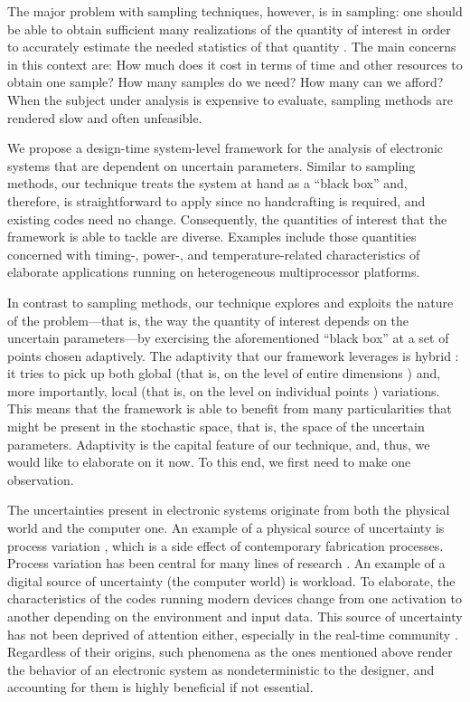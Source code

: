 The major problem with sampling techniques, however, is in sampling: one should
be able to obtain sufficient many realizations of the quantity of interest in
order to accurately estimate the needed statistics of that quantity
\cite{diaz-emparanza2002}. The main concerns in this context are: How much does
it cost in terms of time and other resources to obtain one sample? How many
samples do we need? How many can we afford? When the subject under analysis is
expensive to evaluate, sampling methods are rendered slow and often unfeasible.

We propose a design-time system-level framework for the analysis of electronic
systems that are dependent on uncertain parameters. Similar to sampling methods,
our technique treats the system at hand as a ``black box'' and, therefore, is
straightforward to apply since no handcrafting is required, and existing codes
need no change. Consequently, the quantities of interest that the framework is
able to tackle are diverse. Examples include those quantities concerned with
timing-, power-, and temperature-related characteristics of elaborate
applications running on heterogeneous multiprocessor platforms.

In contrast to sampling methods, our technique explores and exploits the nature
of the problem---that is, the way the quantity of interest depends on the
uncertain parameters---by exercising the aforementioned ``black box'' at a set
of points chosen adaptively. The adaptivity that our framework leverages is
hybrid \cite{jakeman2012}: it tries to pick up both global (that is, on the
level of entire dimensions \cite{klimke2006}) and, more importantly, local (that
is, on the level on individual points \cite{ma2009}) variations. This means that
the framework is able to benefit from many particularities that might be present
in the stochastic space, that is, the space of the uncertain parameters.
Adaptivity is the capital feature of our technique, and, thus, we would like to
elaborate on it now. To this end, we first need to make one observation.

The uncertainties present in electronic systems originate from both the physical
world and the computer one. An example of a physical source of uncertainty is
process variation \cite{srivastava2005}, which is a side effect of contemporary
fabrication processes. Process variation has been central for many lines of
research \cite{bhardwaj2008, juan2012, lee2013, ukhov2014, ukhov2015}. An
example of a digital source of uncertainty (the computer world) is workload. To
elaborate, the characteristics of the codes running modern devices change from
one activation to another depending on the environment and input data. This
source of uncertainty has not been deprived of attention either, especially in
the real-time community \cite{quinton2012, diaz2002, santinelli2011, yang2013,
tanasa2015}. Regardless of their origins, such phenomena as the ones mentioned
above render the behavior of an electronic system as nondeterministic to the
designer, and accounting for them is highly beneficial if not essential.

